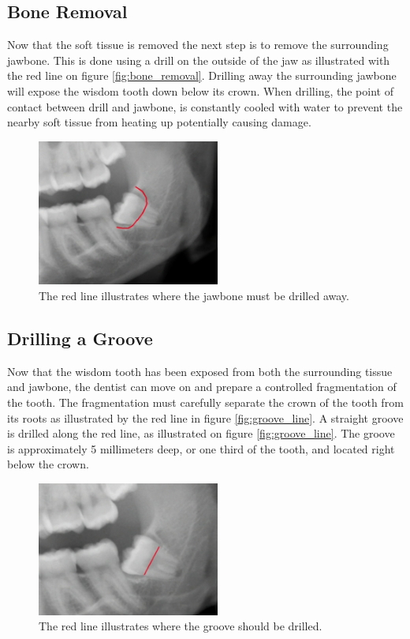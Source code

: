 \subsection*{Bone Removal}
Now that the soft tissue is removed the next step is to remove the
surrounding jawbone. This is done using a drill on the outside of the
jaw as illustrated with the red line on figure
\vref{fig:bone_removal}. Drilling away the surrounding jawbone will
expose the wisdom tooth down below its crown. When drilling, the point
of contact between drill and jawbone, is constantly cooled with 
water to prevent the nearby soft tissue from heating up potentially
causing damage.

\begin{figure}
  \centering
  \includegraphics[width=6cm]{./images/problem_domain_surgery_bone_removal_xray.png}
\caption{The red line illustrates where the jawbone must be drilled
  away. \textdagger}
\label{fig:bone_removal}
\end{figure}

\subsection*{Drilling a Groove}
Now that the wisdom tooth has been exposed from both the surrounding
tissue and jawbone, the dentist can move on and prepare a controlled
fragmentation of the tooth. The fragmentation must carefully separate
the crown of the tooth from its roots as illustrated by the red line
in figure \vref{fig:groove_line}.
A straight groove is drilled along the red line, as illustrated on figure
\vref{fig:groove_line}. The groove is approximately
5 millimeters deep, or one third of the tooth, and located right below
the crown. 

\begin{figure}
  \centering
  \includegraphics[width=6cm]{./images/problem_domain_surgery_fragmentation_line.png}
\caption{The red line illustrates where the groove should be drilled. \textdagger}
\label{fig:groove_line}
\end{figure}

